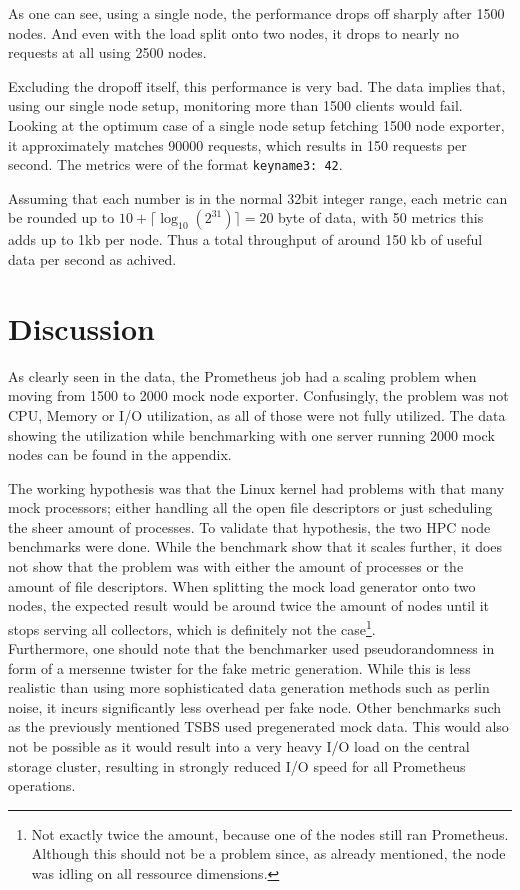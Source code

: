 As one can see, using a single node, the performance drops off sharply after 1500 nodes. And even with the load split onto two nodes, it drops to nearly no requests at all using 2500 nodes. 

Excluding the dropoff itself, this performance is very bad. The data implies that, using our single node setup, monitoring more than 1500 clients would fail. Looking at the optimum case of a single node setup fetching 1500 node exporter, it approximately matches 90000 requests, which results in 150 requests per second. The metrics were of the format \texttt{keyname3: 42}. 

Assuming that each number is in the normal 32bit integer range, each metric can be rounded up to $10+\lceil\log_{10}(2^{31})\rceil = 20$ byte of data, with 50 metrics this adds up to 1kb per node. Thus a total throughput of around 150 kb of useful data per second as achived.


\section{Discussion}
As clearly seen in the data, the Prometheus job had a scaling problem when moving from 1500 to 2000 mock node exporter. Confusingly, the problem was not CPU, Memory or I/O utilization, as all of those were not fully utilized. The data showing the utilization while benchmarking with one server running 2000 mock nodes can be found in the appendix.

The working hypothesis was that the Linux kernel had problems with that many mock processors; either handling all the open file descriptors or just scheduling the sheer amount of processes. To validate that hypothesis, the two \ac{HPC} node benchmarks were done. While the benchmark show that it scales further, it does not show that the problem was with either the amount of processes or the amount of file descriptors. When splitting the mock load generator onto two nodes, the expected result would be around twice the amount of nodes until it stops serving all collectors, which is definitely not the case\footnote{Not exactly twice the amount, because one of the nodes still ran Prometheus. Although this should not be a problem since, as already mentioned, the node was idling on all ressource dimensions.}.\\

Furthermore, one should note that the benchmarker used pseudorandomness in form of a mersenne twister for the fake metric generation. While this is less realistic than using more sophisticated data generation methods such as perlin noise, it incurs significantly less overhead per fake node. Other benchmarks such as the previously mentioned \ac{TSBS} used pregenerated mock data. This would also not be possible as it would result into a very heavy I/O load on the central storage cluster, resulting in strongly reduced I/O speed for all Prometheus operations.\\

